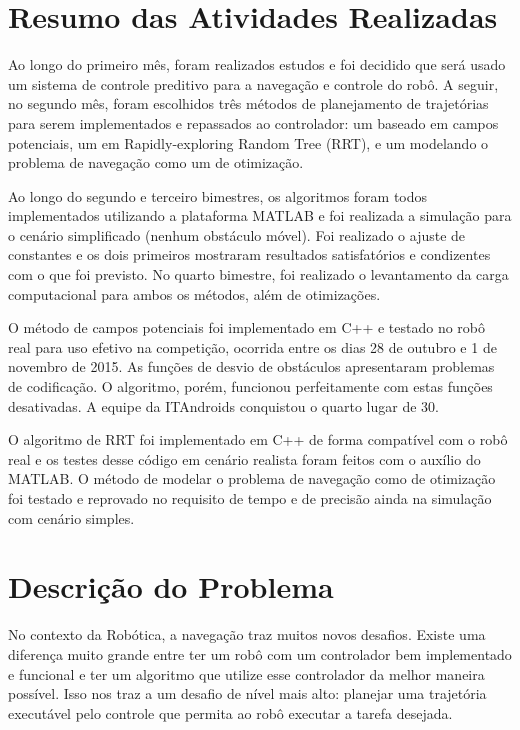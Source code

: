 \documentclass[a4paper,12pt]{article}
\begin{document}
\section{Resumo das Atividades Realizadas}
\label{secao:atividades_realizadas}

Ao longo do primeiro mês, foram realizados estudos e foi decidido que será usado um sistema de controle preditivo para a navegação e controle do robô. A seguir, no segundo mês, foram escolhidos três métodos de planejamento de trajetórias para serem implementados e repassados ao controlador: um baseado em campos potenciais, um em Rapidly-exploring Random Tree (RRT), e um modelando o problema de navegação como um de otimização.

Ao longo do segundo e terceiro bimestres, os algoritmos foram todos implementados utilizando a plataforma MATLAB e foi realizada a simulação para o cenário simplificado (nenhum obstáculo móvel). Foi realizado o ajuste de constantes e os dois primeiros mostraram resultados satisfatórios e condizentes com o que foi previsto. No quarto bimestre, foi realizado o levantamento da carga computacional para ambos os métodos, além de otimizações.

O método de campos potenciais foi implementado em C++ e testado no robô real para uso efetivo na competição, ocorrida entre os dias 28 de outubro e 1 de novembro de 2015. As funções de desvio de obstáculos apresentaram problemas de codificação. O algoritmo, porém, funcionou perfeitamente com estas funções desativadas. A equipe da ITAndroids conquistou o quarto lugar de 30.

O algoritmo de RRT foi implementado em C++ de forma compatível com o robô real e os testes desse código em cenário realista foram feitos com o auxílio do MATLAB. O método de modelar o problema de navegação como de otimização foi testado e reprovado no requisito de tempo e de precisão ainda na simulação com cenário simples.

\section{Descrição do Problema}
\label{secao:enunciado_problema}

No contexto da Robótica, a navegação traz muitos novos desafios. Existe uma diferença muito grande entre ter um robô com um controlador bem implementado e funcional e ter um algoritmo que utilize esse controlador da melhor maneira possível. Isso nos traz a um desafio de nível mais alto: planejar uma trajetória executável pelo controle que permita ao robô executar a tarefa desejada.
\end{document}
